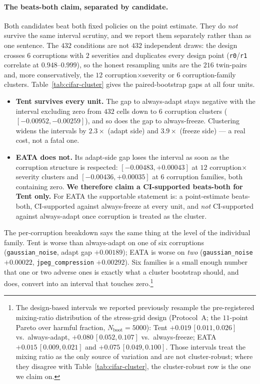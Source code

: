 \paragraph{The beats-both claim, separated by candidate.} Both candidates beat both fixed policies
on the point estimate. They do \emph{not} survive the same interval scrutiny, and we report them
separately rather than as one sentence. The $432$ conditions are not $432$ independent draws: the
design crosses $6$ corruptions with $2$ severities and duplicates every design point
(\texttt{r0}/\texttt{r1} correlate at $0.948$--$0.999$), so the honest resampling units are the
$216$ twin-pairs and, more conservatively, the $12$ corruption$\times$severity or $6$
corruption-family clusters. Table~\ref{tab:cifar-cluster} gives the paired-bootstrap gaps at all
four units.
\begin{itemize}
\item \textbf{Tent survives every unit.} The gap to always-adapt stays negative with the interval
excluding zero from $432$ cells down to $6$ corruption clusters ($[-0.00952,-0.00259]$), and so does
the gap to always-freeze. Clustering widens the intervals by $2.3\times$ (adapt side) and
$3.9\times$ (freeze side) --- a real cost, not a fatal one.
\item \textbf{EATA does not.} Its adapt-side gap loses the interval as soon as the corruption
structure is respected: $[-0.00483,+0.00043]$ at $12$ corruption$\times$severity clusters and
$[-0.00436,+0.00035]$ at $6$ corruption families, both containing zero. \textbf{We therefore claim
a CI-supported beats-both for Tent only.} For EATA the supportable statement is: a point-estimate
beats-both, CI-supported against always-freeze at every unit, and \emph{not} CI-supported against
always-adapt once corruption is treated as the cluster.
\end{itemize}
The per-corruption breakdown says the same thing at the level of the individual family. Tent is
worse than always-adapt on one of six corruptions (\texttt{gaussian\_noise}, adapt gap
$+0.00189$); EATA is worse on \emph{two} (\texttt{gaussian\_noise} $+0.00022$,
\texttt{jpeg\_compression} $+0.00292$). Six families is a small enough number that one or two
adverse ones is exactly what a cluster bootstrap should, and does, convert into an interval that
touches zero.\footnote{The design-based intervals we reported previously resample the
pre-registered mixing-ratio distribution of the stress-grid design (Protocol~A; the $11$-point
Pareto over harmful fraction, $N_{\mathrm{boot}}{=}5000$): Tent $+0.019\,[0.011,0.026]$ vs.\
always-adapt, $+0.080\,[0.052,0.107]$ vs.\ always-freeze; EATA $+0.015\,[0.009,0.021]$ and
$+0.075\,[0.049,0.100]$. Those intervals treat the mixing ratio as the only source of variation and
are not cluster-robust; where they disagree with Table~\ref{tab:cifar-cluster}, the cluster-robust
row is the one we claim on.}

